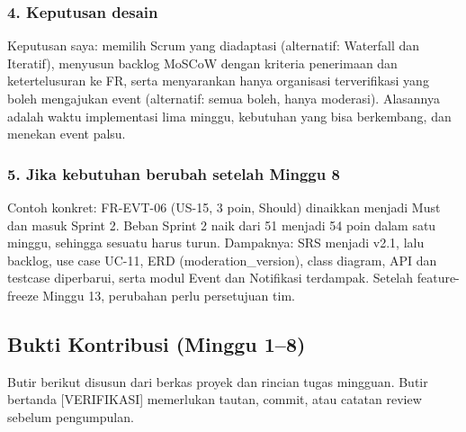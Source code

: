 \documentclass[11pt,a4paper]{article}
\begin{document}
\subsubsection*{4. Keputusan desain}

Keputusan saya: memilih Scrum yang diadaptasi (alternatif: Waterfall dan Iteratif), menyusun backlog MoSCoW dengan kriteria penerimaan dan ketertelusuran ke FR, serta menyarankan hanya organisasi terverifikasi yang boleh mengajukan event (alternatif: semua boleh, hanya moderasi). Alasannya adalah waktu implementasi lima minggu, kebutuhan yang bisa berkembang, dan menekan event palsu.

\subsubsection*{5. Jika kebutuhan berubah setelah Minggu 8}

Contoh konkret: FR-EVT-06 (US-15, 3 poin, Should) dinaikkan menjadi Must dan masuk Sprint 2. Beban Sprint 2 naik dari 51 menjadi 54 poin dalam satu minggu, sehingga sesuatu harus turun. Dampaknya: SRS menjadi v2.1, lalu backlog, use case UC-11, ERD (moderation\_version), class diagram, API dan testcase diperbarui, serta modul Event dan Notifikasi terdampak. Setelah feature-freeze Minggu 13, perubahan perlu persetujuan tim.

\subsection*{Bukti Kontribusi (Minggu 1--8)}

Butir berikut disusun dari berkas proyek dan rincian tugas mingguan. Butir bertanda [VERIFIKASI] memerlukan tautan, commit, atau catatan review sebelum pengumpulan.
\end{document}
